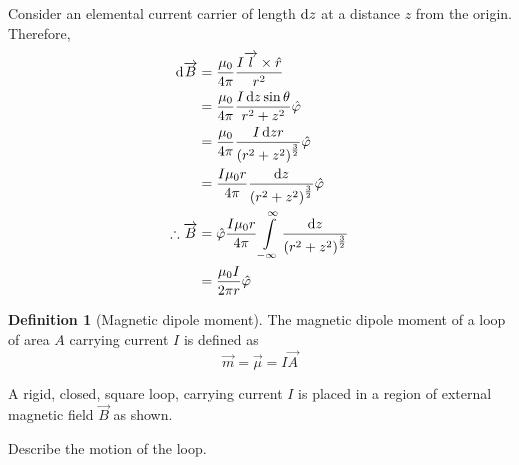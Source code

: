 \documentclass[fleqn, a4paper, 12pt, twoside]{article}
\theoremstyle{definition}
\newtheorem{definition}{Definition}
\theoremstyle{theorem}
\begin{document}
\begin{solution}
	Consider an elemental current carrier of length $\dif z$ at a distance $z$ from the origin.\\
	Therefore,
	\begin{align*}
		\dif \overrightarrow{B}       & = \frac{\mu_0}{4 \pi} \frac{I \overrightarrow{l} \times \hat{r}}{r^2}                                                        \\
                                              & = \frac{\mu_0}{4 \pi} \frac{I \dif z \sin \theta}{r^2 + z^2} \hat{\varphi}                                                   \\
                                              & = \frac{\mu_0}{4 \pi} \frac{I \dif z r}{\left( r^2 + z^2 \right)^{\frac{3}{2}}} \hat{\varphi}                                \\
                                              & = \frac{I \mu_0 r}{4 \pi} \frac{\dif z}{\left( r^2 + z^2 \right)^{\frac{3}{2}}} \hat{\varphi}                                \\
		\therefore \overrightarrow{B} & = \hat{\varphi} \frac{I \mu_0 r}{4 \pi} \int\limits_{-\infty}^{\infty} \frac{\dif z}{\left( r^2 + z^2 \right)^{\frac{3}{2}}} \\
                                              & = \frac{\mu_0 I}{2 \pi r} \hat{\varphi}
	\end{align*}
\end{solution}

\begin{definition}[Magnetic dipole moment]
	The magnetic dipole moment of a loop of area $A$ carrying current $I$ is defined as
	\begin{equation*}
		\overrightarrow{m} = \overrightarrow{\mu} = I \overrightarrow{A}
	\end{equation*}
\end{definition}

\begin{question}
	A rigid, closed, square loop, carrying current $I$ is placed in a region of external magnetic field $\overrightarrow{B}$ as shown.
	\begin{figure}[H]
	\end{figure}
	Describe the motion of the loop.
\end{question}
\end{document}
